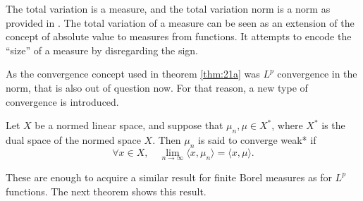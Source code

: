 The total variation is a measure, and the total variation norm is a norm as provided in \cite{axler_measure_2019}. The total variation of a measure can be seen as an extension of the concept of absolute value to measures from functions. It attempts to encode the ``size'' of a measure by disregarding the sign.

As the convergence concept used in theorem \ref{thm:21a} was $L^p$ convergence in the norm, that is also out of question now. For that reason, a new type of convergence is introduced.

\begin{definition}
    Let $X$ be a normed linear space, and suppose that $\mu_n,\mu\in X^*$, where $X^*$ is the dual space of the normed space $X$. Then $\mu_n$ is said to converge weak* if
    \begin{equation*}
        \forall x\in X,\quad\lim_{n\rightarrow\infty}\langle x,\mu_n\rangle=\langle x,\mu\rangle.
    \end{equation*}
\end{definition}

These are enough to acquire a similar result for finite Borel measures as for $L^p$ functions. The next theorem shows this result. 

